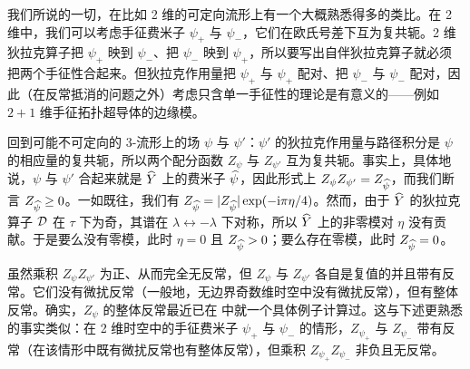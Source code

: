 
我们所说的一切，在比如 2 维的可定向流形上有一个大概熟悉得多的类比。在 2 维中，我们可以考虑手征费米子 $\psi_+$ 与 $\psi_-$，它们在欧氏号差下互为复共轭。2 维狄拉克算子把 $\psi_+$ 映到 $\psi_-$、把 $\psi_-$ 映到 $\psi_+$，所以要写出自伴狄拉克算子就必须把两个手征性合起来。但狄拉克作用量把 $\psi_+$ 与 $\psi_+$ 配对、把 $\psi_-$ 与 $\psi_-$ 配对，因此（在反常抵消的问题之外）考虑只含单一手征性的理论是有意义的——例如 $2+1$ 维手征拓扑超导体的边缘模。

回到可能不可定向的 3-流形上的场 $\psi$ 与 $\psi'$：$\psi'$ 的狄拉克作用量与路径积分是 $\psi$ 的相应量的复共轭，所以两个配分函数 $Z_\psi$ 与 $Z_{\psi'}$ 互为复共轭。事实上，具体地说，$\psi$ 与 $\psi'$ 合起来就是 $\widehat Y$ 上的费米子 $\widehat\psi$，因此形式上 $Z_\psi Z_{\psi'}=Z_{\widehat\psi}$，而我们断言 $Z_{\widehat\psi}\geq 0$。一如既往，我们有 $Z_{\widehat\psi}=|Z_{\widehat\psi}|\exp(-{\mathrm i}\pi\eta/4)$。然而，由于 $\widehat Y$ 的狄拉克算子 ${\mathcal D}$ 在 $\tau$ 下为奇，其谱在 $\lambda \leftrightarrow -\lambda$ 下对称，所以 $\widehat Y$ 上的非零模对 $\eta$ 没有贡献。于是要么没有零模，此时 $\eta=0$ 且 $Z_{\widehat\psi}>0$；要么存在零模，此时 $Z_{\widehat\psi}=0$。


虽然乘积 $Z_\psi Z_{\psi'}$ 为正、从而完全无反常，但 $Z_\psi$ 与 $Z_{\psi'}$ 各自是复值的并且带有反常。它们没有微扰反常（一般地，无边界奇数维时空中没有微扰反常），但有整体反常。确实，$Z_\psi$ 的整体反常最近已在 \cite{HCR} 中就一个具体例子计算过。这与下述更熟悉的事实类似：在 2 维时空中的手征费米子 $\psi_+$ 与 $\psi_-$ 的情形，$Z_{\psi_+}$ 与 $Z_{\psi_-}$ 带有反常（在该情形中既有微扰反常也有整体反常），但乘积 $Z_{\psi_+}Z_{\psi_-}$ 非负且无反常。

